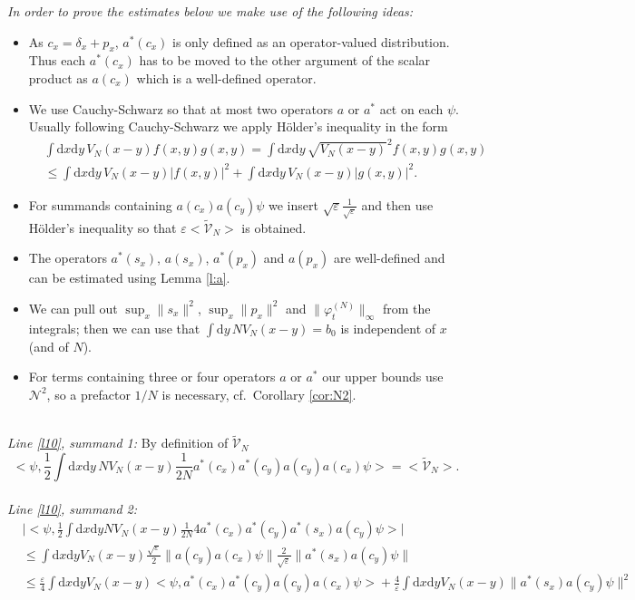 \documentclass[11pt,a4paper,DIV11]{scrartcl}	%
\newcommand{\di}{\textrm{d}}		%
\newcommand{\Ncal}{\mathcal{N}}		%
\newcommand{\tilV}{\tilde{\mathcal{V}}_N}		%
\newcommand{\estlist}[2]{\emph{\vspace{.3em}\\Line \ref{l#1}, summand #2:}}
\newcommand{\scal}[2]{\big<#1,#2\big>} %
\newcommand{\norm}[1]{\lVert#1\rVert}	%
\newcommand{\ev}[1]{\big<#1\big>}	%
\newcommand{\ph}{\varphi_t^{(N)}}	%
\newcommand{\dxyNV}{\frac{1}{2}\int \di x\di y N V_N(x-y)} %
\newcommand{\bd}{\begin{displaymath}}			%
\newcommand{\ed}{\end{displaymath}}
\begin{document}
\begin{fleqn}[0.5em]
\emph{In order to prove the estimates below we make use of the following ideas:}
\begin{itemize}
 \item As $c_x = \delta_x + p_x$, $a^*(c_x)$ is only defined as an operator-valued distribution. Thus each $a^\ast(c_x)$ has to be moved to the other argument of the scalar product as $a(c_x)$ which is a well-defined operator.
\item We use Cauchy-Schwarz so that at most two operators $a$ or $a^\ast$ act on each $\psi$. Usually following Cauchy-Schwarz we apply H\"older's inequality in the form
\bd
\begin{split}
& \int \di x \di y\, V_N(x-y) f(x,y) g(x,y) = \int \di x \di y\, \sqrt{V_N(x-y)}^2 f(x,y) g(x,y)\\
&  \leq \int \di x\di y\, V_N(x-y) \lvert f(x,y)\rvert^2 + \int \di x\di y\, V_N(x-y) \lvert g(x,y)\rvert^2.
\end{split}
\ed
 \item For summands containing $a(c_x) a(c_y) \psi$ we insert $\sqrt{\varepsilon} \frac{1}{\sqrt{\varepsilon}}$ and then use H\"older's inequality so that $\varepsilon\ev{\tilV}$ is obtained.
 \item The operators $a^\ast(s_x)$, $a(s_x)$, $a^\ast(p_x)$ and $a(p_x)$ are well-defined and can be estimated using Lemma \ref{l:a}.
 \item We can pull out $\sup_x \norm{s_x}^2$, $\sup_x \norm{p_x}^2$ and $\norm{\ph}_\infty$ from the integrals; then we can use that $\int \di y\, NV_N(x-y) = b_0$ is independent of $x$ (and of $N$).
\item For terms containing three or four operators $a$ or $a^\ast$ our upper bounds use $\Ncal^2$, so a prefactor $1/N$ is necessary, cf.\ Corollary \ref{cor:N2}. 
\end{itemize}
%
\estlist{10}{1}
By definition of $\tilV$
\bd
\scal{\psi}{\frac{1}{2}\int \di x\di y\, NV_N(x-y)\frac{1}{2N} a^\ast(c_x) a^\ast(c_y) a(c_y) a(c_x)\psi} = \ev{\tilV}.
\ed
\estlist{10}{2}
\begin{align*}
 & \lvert \scal{\psi}{\dxyNV \frac{1}{2N} 4 a^\ast(c_x)a^\ast(c_y) a^\ast(s_x)a(c_y)\psi}\rvert \\
& \leq \int \di x\di y V_N(x-y) \frac{\sqrt{\varepsilon}}{2} \norm{a(c_y) a(c_x)\psi} \frac{2}{\sqrt{\varepsilon}} \norm{a^\ast(s_x)a(c_y)\psi} \\
& \leq \frac{\varepsilon}{4} \int \di x\di y V_N(x-y) \scal{\psi}{a^\ast(c_x)a^\ast(c_y)a(c_y)a(c_x)\psi} + \frac{4}{\varepsilon} \int \di x\di y V_N(x-y) \norm{a^\ast(s_x)a(c_y)\psi}^2 \\

\end{align*}
\end{fleqn}
\end{document}
